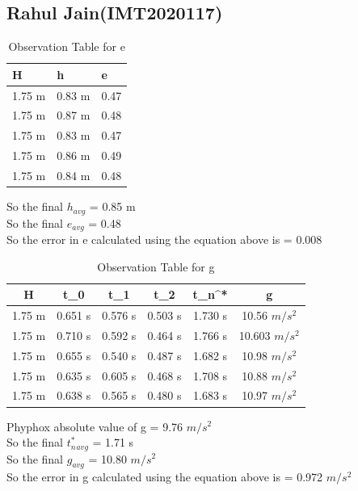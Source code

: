 \documentclass[11pt]{scrartcl} %
\begin{document}
\newpage
\subsection{Rahul Jain(IMT2020117)}

\begin{table}[h] %
	\centering %
	\begin{tabular}{l l l}
		\toprule
		\textbf{H} & \textbf{h} & \textbf{e} \\
		\midrule
		1.75 m & 0.83 m & 0.47\\
        1.75 m & 0.87 m  & 0.48\\
        1.75 m & 0.83 m  & 0.47\\
        1.75 m & 0.86 m & 0.49 \\
        1.75 m & 0.84 m & 0.48 \\
		\bottomrule
	\end{tabular}
	\caption{Observation Table for e}
\end{table}
So the final $h_{avg}$ = 0.85 m\\
So the final $e_{avg}$ = 0.48\\
So the error in e calculated using the equation above is  = 0.008

\begin{table}[h]
\centering
\begin{tabular}{||c c c c c c||} 
\toprule
 \hline
 H & t_0 & t_1 & t_2 & t_n^* & g \\ [0.5ex] 
 \midrule
 \hline\hline
1.75 m & 0.651 s & 0.576 s  & 0.503 s & 1.730 s & 10.56 $m/s^2$  \\ 
 \hline
 1.75 m & 0.710 s & 0.592 s & 0.464 s & 1.766 s & 10.603 $m/s^2$  \\
 \hline
 1.75 m & 0.655 s & 0.540 s & 0.487 s & 1.682 s  & 10.98 $m/s^2$   \\
 \hline
 1.75 m & 0.635 s & 0.605 s & 0.468 s & 1.708 s  & 10.88 $m/s^2$   \\
 \hline
 1.75 m & 0.638 s & 0.565 s & 0.480 s & 1.683 s  & 10.97 $m/s^2$  \\ [1ex]
 \bottomrule
 \hline
\end{tabular}
\caption{Observation Table for g}
\end{table}
Phyphox absolute value of g = 9.76 $m/s^2$\\
So the final $t_n^*_{avg}$ = 1.71 s\\
So the final $g_{avg}$ = 10.80 $m/s^2$\\
So the error in g calculated using the equation above is  = 0.972 $m/s^2$ \\
\end{document}
